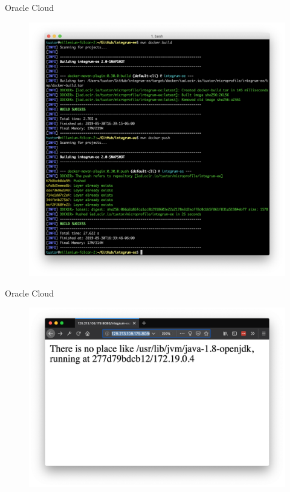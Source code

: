 \documentclass[aspectratio=169]{beamer}
\begin{document}
\begin{frame}{Oracle Cloud}
\begin{figure}
	\centering
	\includegraphics[width=\linewidth]{Images/oc3}
\end{figure}
\end{frame}

\begin{frame}{Oracle Cloud}

\begin{figure}
	\centering
	\includegraphics[width=\linewidth]{Images/oc4}
\end{figure}
\end{frame}
\end{document}
